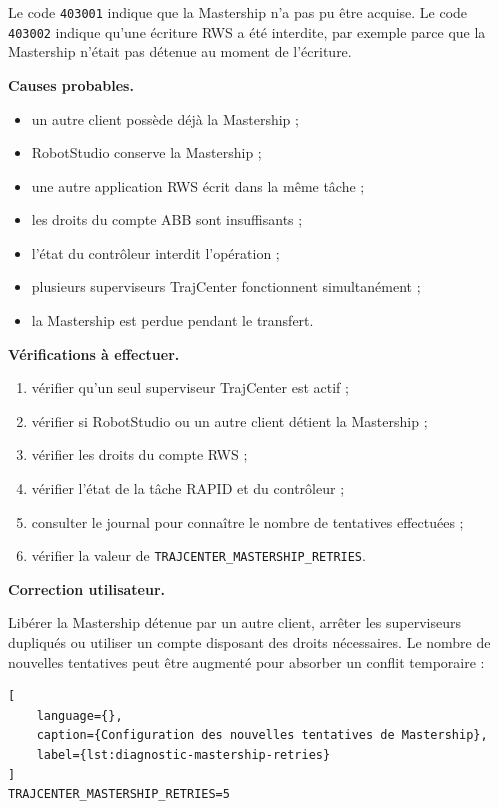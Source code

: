 \documentclass{rapportENSAM}
\begin{document}
Le code \texttt{403001} indique que la Mastership n'a pas pu être acquise. Le
code \texttt{403002} indique qu'une écriture RWS a été interdite, par exemple
parce que la Mastership n'était pas détenue au moment de l'écriture.

\textbf{Causes probables.}

\begin{itemize}
    \item un autre client possède déjà la Mastership ;
    \item RobotStudio conserve la Mastership ;
    \item une autre application RWS écrit dans la même tâche ;
    \item les droits du compte ABB sont insuffisants ;
    \item l'état du contrôleur interdit l'opération ;
    \item plusieurs superviseurs TrajCenter fonctionnent simultanément ;
    \item la Mastership est perdue pendant le transfert.
\end{itemize}

\textbf{Vérifications à effectuer.}

\begin{enumerate}
    \item vérifier qu'un seul superviseur TrajCenter est actif ;
    \item vérifier si RobotStudio ou un autre client détient la Mastership ;
    \item vérifier les droits du compte RWS ;
    \item vérifier l'état de la tâche RAPID et du contrôleur ;
    \item consulter le journal pour connaître le nombre de tentatives
    effectuées ;
    \item vérifier la valeur de
    \texttt{TRAJCENTER\_MASTERSHIP\_RETRIES}.
\end{enumerate}

\textbf{Correction utilisateur.}

Libérer la Mastership détenue par un autre client, arrêter les superviseurs
dupliqués ou utiliser un compte disposant des droits nécessaires. Le nombre de
nouvelles tentatives peut être augmenté pour absorber un conflit temporaire :

\begin{lstlisting}[
    language={},
    caption={Configuration des nouvelles tentatives de Mastership},
    label={lst:diagnostic-mastership-retries}
]
TRAJCENTER_MASTERSHIP_RETRIES=5
\end{lstlisting}
\end{document}
